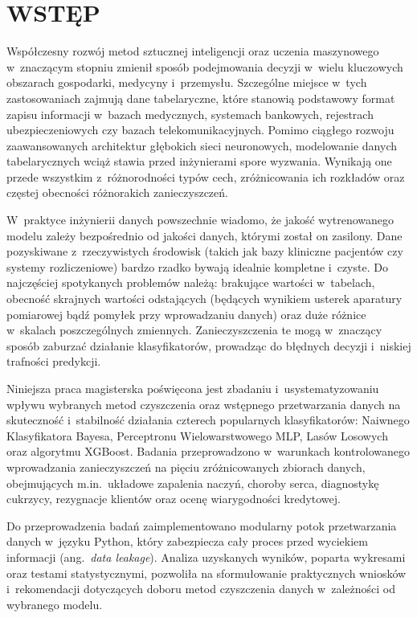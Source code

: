\chapter*{WSTĘP}

Współczesny rozwój metod sztucznej inteligencji oraz uczenia maszynowego w~znaczącym stopniu zmienił sposób podejmowania decyzji w~wielu kluczowych obszarach gospodarki, medycyny i~przemysłu. Szczególne miejsce w~tych zastosowaniach zajmują dane tabelaryczne, które stanowią podstawowy format zapisu informacji w~bazach medycznych, systemach bankowych, rejestrach ubezpieczeniowych czy bazach telekomunikacyjnych. Pomimo ciągłego rozwoju zaawansowanych architektur głębokich sieci neuronowych, modelowanie danych tabelarycznych wciąż stawia przed inżynierami spore wyzwania. Wynikają one przede wszystkim z~różnorodności typów cech, zróżnicowania ich rozkładów oraz częstej obecności różnorakich zanieczyszczeń.

W~praktyce inżynierii danych powszechnie wiadomo, że jakość wytrenowanego modelu zależy bezpośrednio od jakości danych, którymi został on zasilony. Dane pozyskiwane z~rzeczywistych środowisk (takich jak bazy kliniczne pacjentów czy systemy rozliczeniowe) bardzo rzadko bywają idealnie kompletne i~czyste. Do najczęściej spotykanych problemów należą: brakujące wartości w~tabelach, obecność skrajnych wartości odstających (będących wynikiem usterek aparatury pomiarowej bądź pomyłek przy wprowadzaniu danych) oraz duże różnice w~skalach poszczególnych zmiennych. Zanieczyszczenia te mogą w~znaczący sposób zaburzać działanie klasyfikatorów, prowadząc do błędnych decyzji i~niskiej trafności predykcji.

Niniejsza praca magisterska poświęcona jest zbadaniu i~usystematyzowaniu wpływu wybranych metod czyszczenia oraz wstępnego przetwarzania danych na skuteczność i~stabilność działania czterech popularnych klasyfikatorów: Naiwnego Klasyfikatora Bayesa, Perceptronu Wielowarstwowego MLP, Lasów Losowych oraz algorytmu XGBoost. Badania przeprowadzono w~warunkach kontrolowanego wprowadzania zanieczyszczeń na pięciu zróżnicowanych zbiorach danych, obejmujących m.in.~układowe zapalenia naczyń, choroby serca, diagnostykę cukrzycy, rezygnacje klientów oraz ocenę wiarygodności kredytowej.

Do przeprowadzenia badań zaimplementowano modularny potok przetwarzania danych w~języku Python, który zabezpiecza cały proces przed wyciekiem informacji (ang.~\textit{data leakage}). Analiza uzyskanych wyników, poparta wykresami oraz testami statystycznymi, pozwoliła na sformułowanie praktycznych wniosków i~rekomendacji dotyczących doboru metod czyszczenia danych w~zależności od wybranego modelu.
